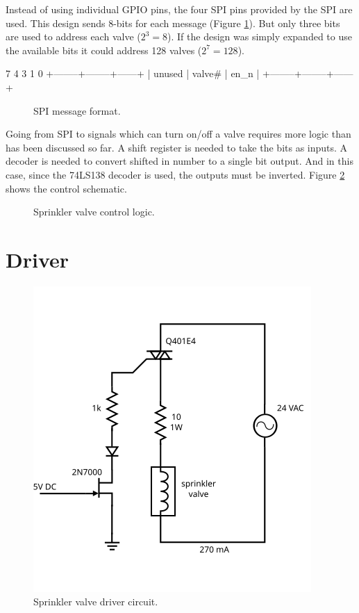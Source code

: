 \documentclass{article}
\begin{document}
Instead of using individual GPIO pins, the four SPI pins provided by
the SPI are used.
This design sends 8-bits for each message (Figure \ref{fig:spi}).
But only three bits are used to address each valve ($2^3 = 8$).
If the design was simply expanded to use the available bits
it could address 128 valves ($2^7 = 128$).

\begin{verbbox}
  7      4 3      1      0
 +--------+--------+------+
 | unused | valve# | en_n |
 +--------+--------+------+
\end{verbbox}
\begin{figure}[hbp]
\centering
\theverbbox
\caption{SPI message format.}
\label{fig:spi}
\end{figure}

Going from SPI to signals which can turn on/off a valve requires
more logic than has been discussed so far.
A shift register is needed to take the bits as inputs.
A decoder is needed to convert shifted in number to a single
bit output.
And in this case, since the 74LS138 decoder is used, the outputs
must be inverted.
Figure \ref{fig:control} shows the control schematic.

\begin{figure}[hbp]
\caption{Sprinkler valve control logic.}\label{fig:control}
\end{figure}

\clearpage
\section{Driver}
\label{sec:driver}

\begin{figure}[hbp]
\centering
\includegraphics[scale=1.5]{figs/driver}
\caption{Sprinkler valve driver circuit.}\label{fig:driver}
\end{figure}
\end{document}
